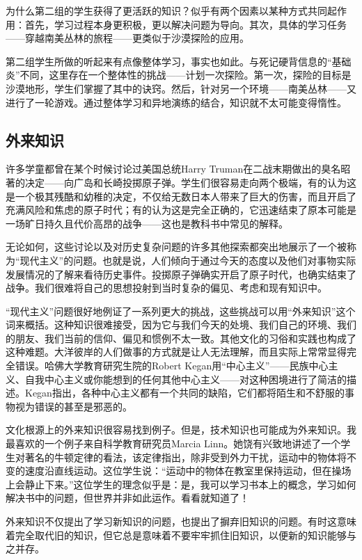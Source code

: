 为什么第二组的学生获得了更活跃的知识？似乎有两个因素以某种方式共同起作用：首先，学习过程本身更积极，更以解决问题为导向。其次，具体的学习任务——穿越南美丛林的旅程——更类似于沙漠探险的应用。

第二组学生所做的听起来有点像整体学习，事实也如此。与死记硬背信息的“基础炎”不同，这里存在一个整体性的挑战——计划一次探险。第一次，探险的目标是沙漠地形，学生们掌握了其中的诀窍。然后，针对另一个环境——南美丛林——又进行了一轮游戏。通过整体学习和异地演练的结合，知识就不太可能变得惰性。

\subsection*{外来知识}

许多学童都曾在某个时候讨论过美国总统Harry Truman在二战末期做出的臭名昭著的决定——向广岛和长崎投掷原子弹。学生们很容易走向两个极端，有的认为这是一个极其残酷和幼稚的决定，不仅给无数日本人带来了巨大的伤害，而且开启了充满风险和焦虑的原子时代；有的认为这是完全正确的，它迅速结束了原本可能是一场旷日持久且代价高昂的战争——这也是教科书中常见的解释。

无论如何，这些讨论以及对历史复杂问题的许多其他探索都突出地展示了一个被称为“现代主义”的问题。也就是说，人们倾向于通过今天的态度以及他们对事物实际发展情况的了解来看待历史事件。投掷原子弹确实开启了原子时代，也确实结束了战争。我们很难将自己的思想投射到当时复杂的偏见、考虑和现有知识中。

“现代主义”问题很好地例证了一系列更大的挑战，这些挑战可以用“外来知识”这个词来概括。这种知识很难接受，因为它与我们今天的处境、我们自己的环境、我们的朋友、我们当前的信仰、偏见和惯例不太一致。其他文化的习俗和实践也构成了这种难题。大洋彼岸的人们做事的方式就是让人无法理解，而且实际上常常显得完全错误。哈佛大学教育研究生院的Robert Kegan用“中心主义”——民族中心主义、自我中心主义或你能想到的任何其他中心主义——对这种困境进行了简洁的描述。Kegan指出，各种中心主义都有一个共同的缺陷，它们都将陌生和不舒服的事物视为错误的甚至是邪恶的。

文化根源上的外来知识很容易找到例子。但是，技术知识也可能成为外来知识。我最喜欢的一个例子来自科学教育研究员Marcia Linn。她饶有兴致地讲述了一个学生对著名的牛顿定律的看法，该定律指出，除非受到外力干扰，运动中的物体将不变的速度沿直线运动。这位学生说：“运动中的物体在教室里保持运动，但在操场上会静止下来。”这位学生的理念似乎是：是，我可以学习书本上的概念，学习如何解决书中的问题，但世界并非如此运作。看看就知道了！

外来知识不仅提出了学习新知识的问题，也提出了摒弃旧知识的问题。有时这意味着完全取代旧的知识，但它总是意味着不要牢牢抓住旧知识，以便新的知识能够与之并存。

